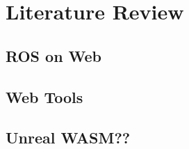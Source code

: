 \chapter{Literature Review}\label{cha:literature}


\section{ROS on Web}\label{sec:ros_on_web}

\section{Web Tools}\label{sec:ros_on_web}

\section{Unreal WASM??}